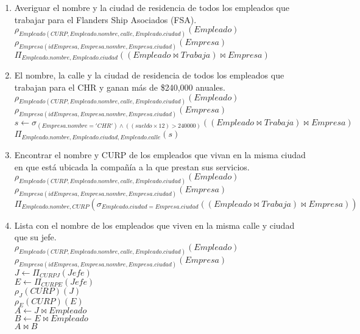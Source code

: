 \documentclass{article}
\begin{document}
\begin{enumerate}
\begin{enumerate}
				\item Averiguar el nombre y la ciudad de residencia de todos los empleados que trabajar para el
				Flanders Ship Asociados (FSA).\\
				
				$\rho_{Empleado(CURP, Empleado.nombre, calle, Empleado.ciudad)}(Empleado)$\\
				$\rho_{Empresa(idEmpresa, Empresa.nombre, Empresa.ciudad)}(Empresa)$\\
				$\Pi_{Empleado.nombre, Empleado.ciudad}((Empleado \bowtie Trabaja) \bowtie Empresa)$\\
				
				\item El nombre, la calle y la ciudad de residencia de todos los empleados que trabajan para el CHR
				y ganan más de \$240,000 anuales.\\
				
				$\rho_{Empleado(CURP, Empleado.nombre, calle, Empleado.ciudad)}(Empleado)$\\
				$\rho_{Empresa(idEmpresa, Empresa.nombre, Empresa.ciudad)}(Empresa)$\\
				$s \leftarrow \sigma_{(Empresa.nombre = 'CHR') \land ((sueldo \times 12) > 240 000)}((Empleado \bowtie Trabaja) \bowtie Empresa)$\\
				$\Pi_{Empleado.nombre, Empleado.ciudad, Empleado.calle}(s)$\\
				
				\item Encontrar el nombre y CURP de los empleados que vivan en la misma ciudad en que está
				ubicada la compañía a la que prestan sus servicios.\\
				
				$\rho_{Empleado(CURP, Empleado.nombre, calle, Empleado.ciudad)}(Empleado)$\\
				$\rho_{Empresa(idEmpresa, Empresa.nombre, Empresa.ciudad)}(Empresa)$\\
				$\Pi_{Empleado.nombre, CURP}(\sigma_{Empleado.ciudad = Empresa.ciudad}((Empleado \bowtie Trabaja) \bowtie Empresa))$\\
				
				\item Lista con el nombre de los empleados que viven en la misma calle y ciudad que su jefe.\\
				
				$\rho_{Empleado(CURP, Empleado.nombre, calle, Empleado.ciudad)}(Empleado)$\\
				$\rho_{Empresa(idEmpresa, Empresa.nombre, Empresa.ciudad)}(Empresa)$\\
				$J \leftarrow \Pi_{CURPJ}(Jefe)$\\
				$E \leftarrow \Pi_{CURPE}(Jefe)$\\
				$\rho_{J}(CURP)(J)$\\
				$\rho_{E}(CURP)(E)$\\
				$A \leftarrow J \bowtie Empleado$\\			
				$B \leftarrow E \bowtie Empleado$\\
				$A \bowtie B$\\
				

\end{enumerate}
\end{enumerate}
\end{document}
